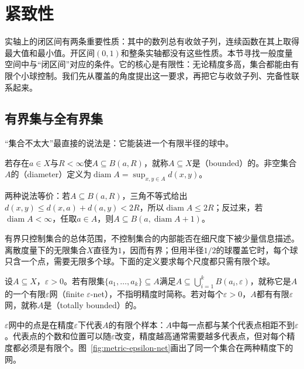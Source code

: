 \section{紧致性}
\label{sec:metric-compactness}

实轴上的闭区间有两条重要性质：其中的数列总有收敛子列，连续函数在其上取得最大值和最小值。开区间$(0,1)$和整条实轴都没有这些性质。本节寻找一般度量空间中与“闭区间”对应的条件。它的核心是有限性：无论精度多高，集合都能由有限个小球控制。我们先从覆盖的角度提出这一要求，再把它与收敛子列、完备性联系起来。

\subsection{有界集与全有界集}
\label{sec:metric-totally-bounded}

“集合不太大”最直接的说法是：它能装进一个有限半径的球中。

\begin{definition}[有界集]
\label{def:metric-bounded}
若存在$a\in X$与$R<\infty$使$A\subseteq B(a,R)$，就称$A\subseteq X$是（bounded）的。非空集合$A$的（diameter）定义为$\operatorname{diam}A=\sup_{x,y\in A}d(x,y)$。
\end{definition}

两种说法等价：若$A\subseteq B(a,R)$，三角不等式给出$d(x,y)\leq d(x,a)+d(a,y)<2R$，所以$\operatorname{diam}A\leq2R$；反过来，若$\operatorname{diam}A<\infty$，任取$a\in A$，则$A\subseteq B(a,\operatorname{diam}A+1)$。

有界只控制集合的总体范围，不控制集合的内部能否在细尺度下被少量信息描述。离散度量下的无限集合$X$直径为$1$，因而有界；但用半径$1/2$的球覆盖它时，每个球只含一个点，需要无限多个球。下面的定义要求每个尺度都只需有限个球。

\begin{definition}
\label{def:metric-totally-bounded}
设$A\subseteq X$，$\varepsilon>0$。若有限集$\{a_1,\dots,a_k\}\subseteq A$满足$A\subseteq\bigcup_{i=1}^kB(a_i,\varepsilon)$，就称它是$A$的一个有限$\varepsilon$网（finite $\varepsilon$-net），不指明精度时简称。若对每个$\varepsilon>0$，$A$都有有限$\varepsilon$网，就称$A$是（totally bounded）的。
\end{definition}

$\varepsilon$网中的点是在精度$\varepsilon$下代表$A$的有限个样本：$A$中每一点都与某个代表点相距不到$\varepsilon$。代表点的个数和位置可以随$\varepsilon$改变，精度越高通常需要越多代表点，但对每个精度都必须是有限个。图~\ref{fig:metric-epsilon-net}画出了同一个集合在两种精度下的网。

